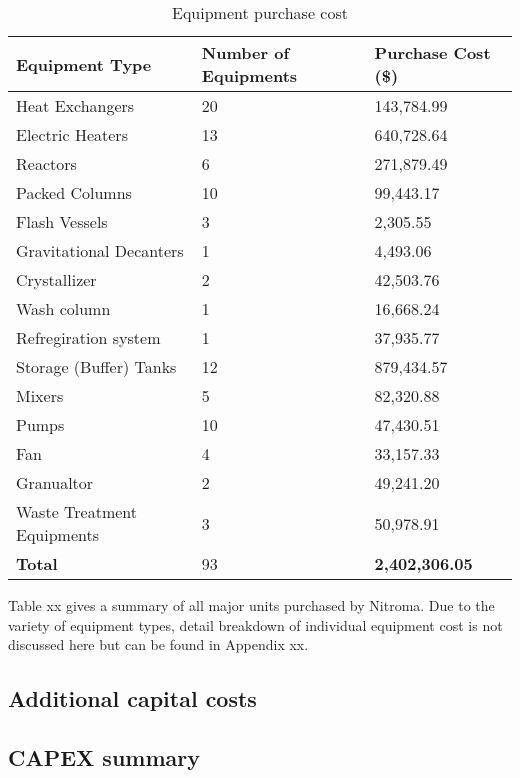 \begin{table}[H]
\centering
\caption{Equipment purchase cost}
\label{equipment purchase}
\begin{tabular}{lll}
\toprule
\textbf{Equipment Type}    & \textbf{Number of Equipments} & \textbf{Purchase Cost (\$)} \\\midrule
Heat Exchangers            & 20                            & 143,784.99                  \\
Electric Heaters           & 13                            & 640,728.64                  \\
Reactors                   & 6                             & 271,879.49                  \\
Packed Columns             & 10                            & 99,443.17                   \\
Flash Vessels              & 3                             & 2,305.55                    \\
Gravitational Decanters    & 1                             & 4,493.06                    \\
Crystallizer               & 2                             & 42,503.76                   \\
Wash column                & 1                             & 16,668.24                   \\
Refregiration system       & 1                             & 37,935.77                   \\
Storage (Buffer) Tanks     & 12                            & 879,434.57                  \\
Mixers                     & 5                             & 82,320.88                   \\
Pumps                      & 10                            & 47,430.51                   \\
Fan                        & 4                             & 33,157.33                   \\
Granualtor                 & 2                             & 49,241.20                   \\
Waste Treatment Equipments & 3                             & 50,978.91                   \\ \hline
\textbf{Total}             & 93                            & \textbf{2,402,306.05}       \\ \bottomrule
\end{tabular}
\end{table}

Table xx gives a summary of all major units purchased by Nitroma. Due to the variety of equipment types, detail breakdown of individual equipment cost is not discussed here but can be found in Appendix xx.


\subsection{Additional capital costs}
\subsection{CAPEX summary}